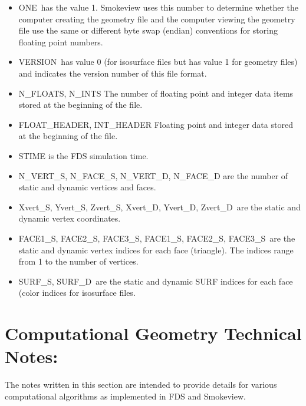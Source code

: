 \documentclass[12pt]{article}
\begin{document}
\begin{itemize}
\item {\ct ONE}\ has the value 1. Smokeview uses this number to determine whether the computer creating the geometry file and the computer viewing the geometry file use the same or different byte swap (endian) conventions for storing floating point numbers.
\item {\ct VERSION}\ has value 0 (for isosurface files but has value 1 for geometry files) and indicates the version number of this file format.
\item {\ct N\_FLOATS, N\_INTS} The number of floating point and integer data items stored at the beginning of the file.
\item {\ct FLOAT\_HEADER, INT\_HEADER} Floating point and integer data stored at the beginning of the file.
\item {\ct STIME} is the FDS simulation time.
\item {\ct N\_VERT\_S, N\_FACE\_S, N\_VERT\_D, N\_FACE\_D} are the number of static and dynamic vertices and faces.
\item {\ct Xvert\_S, Yvert\_S, Zvert\_S, Xvert\_D, Yvert\_D, Zvert\_D}\ are the static and dynamic vertex coordinates.
\item {\ct FACE1\_S, FACE2\_S, FACE3\_S, FACE1\_S, FACE2\_S, FACE3\_S}\ are the static and dynamic vertex indices for each face (triangle).
    The indices range from 1 to the number of vertices.
\item {\ct SURF\_S, SURF\_D}\ are the static and dynamic SURF indices for each face (color indices for isosurface files.
\end{itemize}









\section{Computational Geometry Technical Notes:}

The notes written in this section are intended to provide details for various computational algorithms as implemented in FDS and Smokeview.
\end{document}

